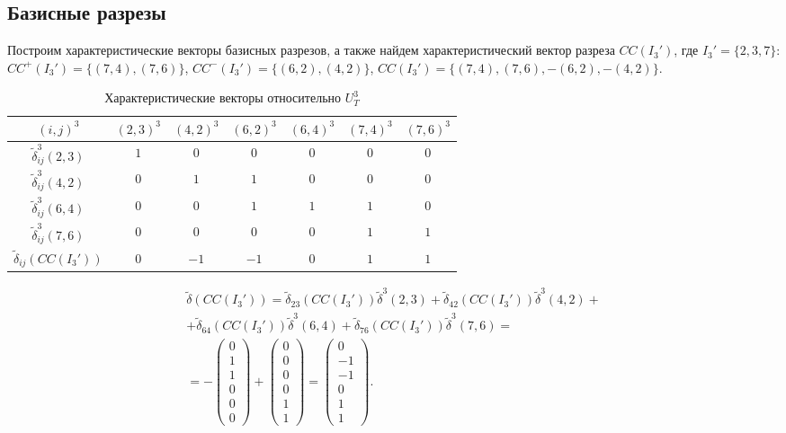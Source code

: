 \documentclass[a4paper,14pt,usenames,dvipsnames]{extreport}
\begin{document}
\subsection*{Базисные разрезы}

Построим характеристические векторы базисных разрезов, а также найдем характеристический вектор разреза   $CC(I_3')$, где $I_3' = \{2, 3, 7\}$: $CC^+(I_3') = \{(7, 4), (7, 6)\}$, $CC^-(I_3') = \{(6,2), (4,2)\}$, $CC(I_3') = \{(7, 4), (7, 6), -(6,2), -(4,2)\}$.
\begin{table}[H]
\renewcommand{\arraystretch}{1.3}
\caption{Характеристические векторы относительно $U_{T}^{3}$}
\label{tab:u3}
\begin{center}
\begin{tabular}{|c|c|c|c|c|c|c|}
\hline $(i, j)^{3}$ & 
$(2,3)^{3}$&$(4,2)^{3}$&$(6,2)^{3}$&$(6,4)^{3}$&$(7,4)^{3}$&$(7,6)^{3}$ \\ \hline 
$\tilde{\delta}_{i j}^{3}(2,3)$ 
& $1$ & $0$ & $0$ & $0$ & $0$ & $0$ \\ \hline 
$\tilde{\delta}_{i j}^{3}(4,2)$ 
& $0$ & $1$ & $1$ & $0$ & $0$ & $0$ \\ \hline
$\tilde{\delta}_{i j}^{3}(6,4)$ 
& $0$ & $0$ & $1$ & $1$ & $1$ & $0$ \\ \hline
$\tilde{\delta}_{i j}^{3}(7,6)$ 
& $0$ & $0$ & $0$ & $0$ & $1$ & $1$ \\ \hline
$\tilde{\delta}_{i j}(CC(I_3'))$
& $0$ & $-1$ & $-1$ & $0$ & $1$ & $1$ \\
\hline
\end{tabular}
\end{center}
\end{table}

\begin{gather*}
\tilde{\delta}(CC(I_3')) = 
\tilde{\delta}_{23}(CC(I_3')) \tilde{\delta}^{3}(2,3) +\tilde{\delta}_{42}(CC(I_3')) \tilde{\delta}^{3}(4,2) + \\ + 
\tilde{\delta}_{64}(CC(I_3')) \tilde{\delta}^{3}(6,4) + \tilde{\delta}_{76}(CC(I_3')) \tilde{\delta}^{3}(7,6)  = \\ = -\begin{pmatrix}
0 \\ 
1 \\ 
1 \\ 
0 \\ 
0 \\ 
0
\end{pmatrix} +
\begin{pmatrix}
0 \\ 
0 \\ 
0 \\ 
0 \\ 
1 \\ 
1
\end{pmatrix} = \begin{pmatrix}
0 \\ 
-1 \\ 
-1 \\ 
0 \\ 
1 \\ 
1
\end{pmatrix}.
\end{gather*}
\end{document}
